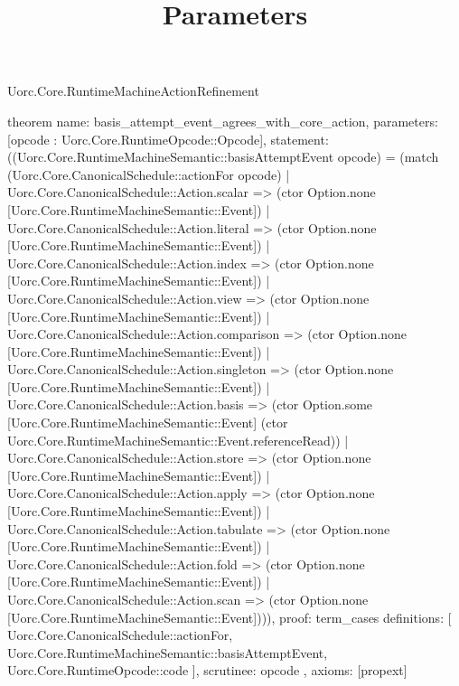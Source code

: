 \begin{lexlean}{Uorc.Core.RuntimeMachineActionRefinement}
\title{Parameters}
\begin{semanticmodule}
theorem{
  name: basis_attempt_event_agrees_with_core_action,
  parameters: [opcode : Uorc.Core.RuntimeOpcode::Opcode],
  statement: ((Uorc.Core.RuntimeMachineSemantic::basisAttemptEvent opcode) = (match (Uorc.Core.CanonicalSchedule::actionFor opcode)
    | Uorc.Core.CanonicalSchedule::Action.scalar => (ctor Option.none [Uorc.Core.RuntimeMachineSemantic::Event])
    | Uorc.Core.CanonicalSchedule::Action.literal => (ctor Option.none [Uorc.Core.RuntimeMachineSemantic::Event])
    | Uorc.Core.CanonicalSchedule::Action.index => (ctor Option.none [Uorc.Core.RuntimeMachineSemantic::Event])
    | Uorc.Core.CanonicalSchedule::Action.view => (ctor Option.none [Uorc.Core.RuntimeMachineSemantic::Event])
    | Uorc.Core.CanonicalSchedule::Action.comparison => (ctor Option.none [Uorc.Core.RuntimeMachineSemantic::Event])
    | Uorc.Core.CanonicalSchedule::Action.singleton => (ctor Option.none [Uorc.Core.RuntimeMachineSemantic::Event])
    | Uorc.Core.CanonicalSchedule::Action.basis => (ctor Option.some [Uorc.Core.RuntimeMachineSemantic::Event] (ctor Uorc.Core.RuntimeMachineSemantic::Event.referenceRead))
    | Uorc.Core.CanonicalSchedule::Action.store => (ctor Option.none [Uorc.Core.RuntimeMachineSemantic::Event])
    | Uorc.Core.CanonicalSchedule::Action.apply => (ctor Option.none [Uorc.Core.RuntimeMachineSemantic::Event])
    | Uorc.Core.CanonicalSchedule::Action.tabulate => (ctor Option.none [Uorc.Core.RuntimeMachineSemantic::Event])
    | Uorc.Core.CanonicalSchedule::Action.fold => (ctor Option.none [Uorc.Core.RuntimeMachineSemantic::Event])
    | Uorc.Core.CanonicalSchedule::Action.scan => (ctor Option.none [Uorc.Core.RuntimeMachineSemantic::Event]))),
  proof: term_cases{
    definitions: [
      Uorc.Core.CanonicalSchedule::actionFor,
      Uorc.Core.RuntimeMachineSemantic::basisAttemptEvent,
      Uorc.Core.RuntimeOpcode::code
    ],
    scrutinee: opcode
  },
  axioms: [propext]
}
\end{semanticmodule}
\end{lexlean}
